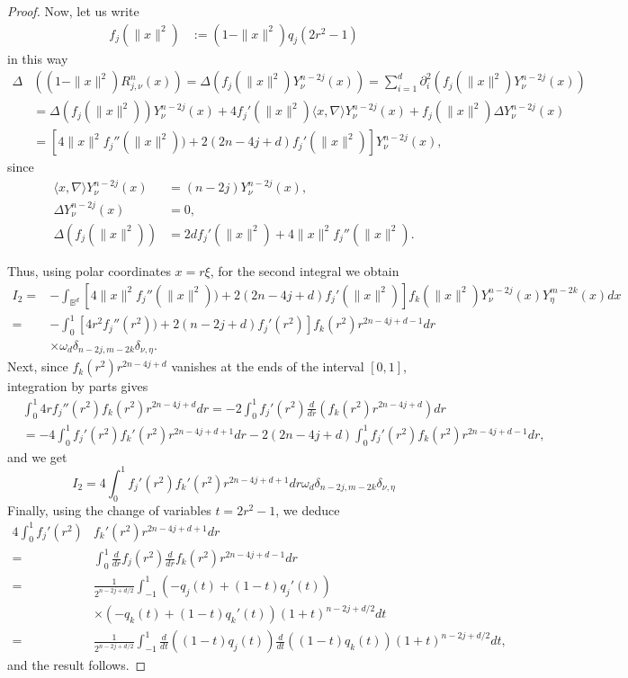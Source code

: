 \documentclass[10pt,a4paper]{amsart}
\begin{document}
\begin{proof}
Now, let us write
\begin{align*}
f_j(\|x\|^2) &:= (1-\|x\|^2)  q_{j}(2 r^2 -1)  
\end{align*}
in this way 
\begin{align*}
\Delta &((1-\|x\|^2)R_{j,\nu}^{n}(x)) = \Delta \left( f_j(\|x\|^2) Y_\nu^{n-2j}(x)\right) = \sum_{i=1}^d \partial_i^2 \left( f_j(\|x\|^2) Y_\nu^{n-2j}(x)\right)\\
&= \Delta (f_j(\|x\|^2)) Y_\nu^{n-2j}(x)+ 4 f_j'(\|x\|^2) \langle  x,\nabla\rangle Y_\nu^{n-2j}(x)
+ f_j(\|x\|^2) \Delta Y_\nu^{n-2j}(x) \\
& = \left[ 4 \|x\|^2 f_j''(\|x\|^2)) + 2(2n-4j + d) f_j'(\|x\|^2)\right] Y_\nu^{n-2j}(x),
\end{align*}
since  
\begin{align*}\langle x,\nabla\rangle Y_\nu^{n-2j}(x) &= (n-2j) Y_\nu^{n-2j}(x),\\
\Delta Y_\nu^{n-2j}(x) &= 0,\\
\Delta (f_j(\|x\|^2)) &= 2 d f_j'(\|x\|^2) + 4 \|x\|^2 f_j''(\|x\|^2).
\end{align*}

Thus, using polar coordinates $ x = r \xi$, for the second integral we obtain 
\begin{align*}
I_2 =& - \int_{\mathbb{B}^d} \left[ 4 \|x\|^2 f_j''(\|x\|^2)) + 2(2n-4j + d) f_j'(\|x\|^2)\right] f_k(\|x\|^2) Y_\nu^{n-2j}(x) Y_\eta^{m-2k}(x)dx\\
=& - \int_0^1 \left[ 4 r^2 f_j''(r^2)) + 2(n-2j + d) f_j'(r^2)\right] f_k(r^2) r^{2n-4j+d-1} dr \\
&\times \omega_d \delta_{n-2j,m-2k} \delta_{\nu,\eta}.
\end{align*}
Next, since \(f_k(r^2) r^{2n-4j+d}\) vanishes at the ends of the interval \([0,1]\), integration by parts gives
\begin{align*}
&\int_0^1 4 r f_j''(r^2) f_k(r^2) r^{2n-4j+d} dr =
- 2 \int_0^1  f_j'(r^2) \frac{d}{dr}\left(f_k(r^2) r^{2n-4j+d}\right) dr \\
&= - 4 \int_0^1  f_j'(r^2) f_k'(r^2) r^{2n-4j+d+1} dr  -
2(2n-4j+d) \int_0^1  f_j'(r^2) f_k(r^2) r^{2n-4j+d-1} dr,
\end{align*}
and we get
\[
I_2 = 4 \int_0^1  f_j'(r^2) f_k'(r^2) r^{2n-4j+d+1} dr \omega_d \delta_{n-2j,m-2k} \delta_{\nu,\eta}
\]
Finally, using the change of variables \( t = 2 r^2 -1\), we deduce
\begin{align*}
 4 \int_0^1  f_j'(r^2)& f_k'(r^2) r^{2n-4j+d+1} dr \\
=& \int_0^1 \frac{d}{dr}f_j(r^2) \frac{d}{dr}f_k(r^2)r^{2n-4j+d-1} dr \\
=& \frac{1}{2^{n-2j+d/2}} \int_{-1}^1 \left(- q_j(t) +  (1-t)q_j'(t)\right) \\
& \times \left(- q_k(t) +  (1-t)q_k'(t)\right) (1+t)^{n-2j+d/2} dt \\
=& \frac{1}{2^{n-2j+d/2}} \int_{-1}^1 \frac{d}{dt}\left((1-t)q_j(t)\right) \frac{d}{dt}\left((1-t)q_k(t)\right) (1+t)^{n-2j+d/2} dt,
\end{align*}
and the result follows.
\end{proof}
\end{document}

